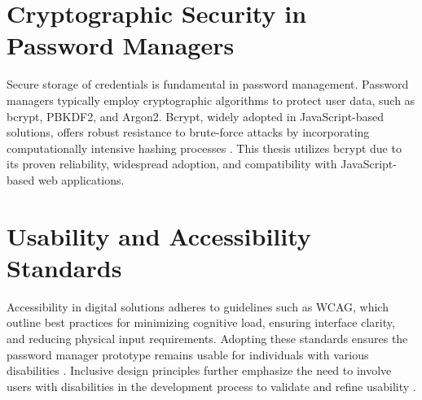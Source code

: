 \section{Cryptographic Security in Password Managers}
Secure storage of credentials is fundamental in password management. Password managers typically employ cryptographic algorithms to protect user data, such as bcrypt, PBKDF2, and Argon2. Bcrypt, widely adopted in JavaScript-based solutions, offers robust resistance to brute-force attacks by incorporating computationally intensive hashing processes \autocite{Pant2022}. This thesis utilizes bcrypt due to its proven reliability, widespread adoption, and compatibility with JavaScript-based web applications.

\section{Usability and Accessibility Standards}
Accessibility in digital solutions adheres to guidelines such as WCAG, which outline best practices for minimizing cognitive load, ensuring interface clarity, and reducing physical input requirements. Adopting these standards ensures the password manager prototype remains usable for individuals with various disabilities \autocite{Brewer2023}. Inclusive design principles further emphasize the need to involve users with disabilities in the development process to validate and refine usability \autocite{Lazar2015}.






